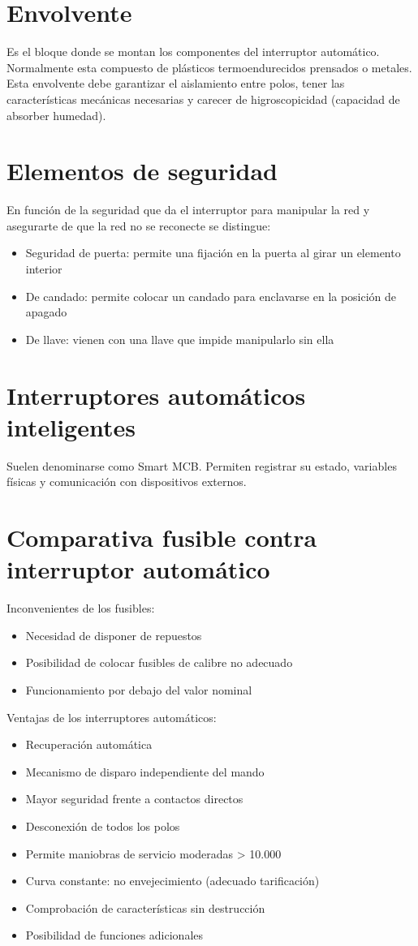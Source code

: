 \section{Envolvente}
Es el bloque donde se montan los componentes del interruptor automático. Normalmente esta compuesto de plásticos termoendurecidos prensados o metales. Esta envolvente debe garantizar el aislamiento entre polos, tener las características mecánicas necesarias y carecer de higroscopicidad (capacidad de absorber humedad).
\section{Elementos de seguridad}
En función de la seguridad que da el interruptor para manipular la red y asegurarte de que la red no se reconecte se distingue:
\begin{itemize}
	\item Seguridad de puerta: permite una fijación en la puerta al girar un elemento interior
	\item De candado: permite colocar un candado para enclavarse en la posición de apagado
	\item De llave: vienen con una llave que impide manipularlo sin ella
\end{itemize}
\section{Interruptores automáticos inteligentes}
Suelen denominarse como Smart MCB. Permiten registrar su estado, variables físicas y comunicación con dispositivos externos.
\section{Comparativa fusible contra interruptor automático}
Inconvenientes de los fusibles:
\begin{itemize}
	\item Necesidad de disponer de repuestos
	\item Posibilidad de colocar fusibles de calibre no adecuado
	\item Funcionamiento por debajo del valor nominal
\end{itemize}

Ventajas de los interruptores automáticos:
\begin{itemize}
	\item Recuperación automática
	\item Mecanismo de disparo independiente del mando
	\item Mayor seguridad frente a contactos directos
	\item Desconexión de todos los polos
	\item Permite maniobras de servicio moderadas > 10.000
	\item Curva constante: no envejecimiento (adecuado tarificación)
	\item Comprobación de características sin destrucción
	\item Posibilidad de funciones adicionales
\end{itemize}